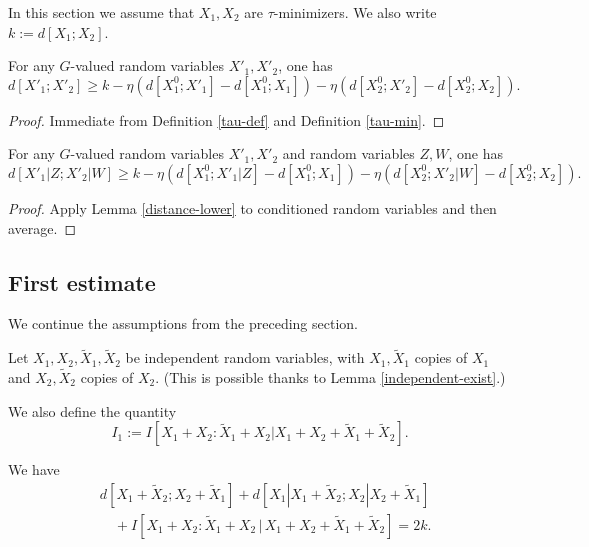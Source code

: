 In this section we assume that $X_1,X_2$ are $\tau$-minimizers. We also write $k := d[X_1;X_2]$.

\begin{lemma}\label{distance-lower}
  \leanok
  For any $G$-valued random variables $X'_1,X'_2$, one has
$$ d[X'_1;X'_2] \geq k - \eta (d[X^0_1;X'_1] - d[X^0_1;X_1] ) - \eta (d[X^0_2;X'_2] - d[X^0_2;X_2] ).$$
\end{lemma}

\begin{proof}
  \leanok
  Immediate from Definition \ref{tau-def} and Definition \ref{tau-min}.
\end{proof}

\begin{lemma}\label{cond-distance-lower}
  \leanok
  For any $G$-valued random variables $X'_1,X'_2$ and random variables $Z,W$, one has
$$ d[X'_1|Z;X'_2|W] \geq k - \eta (d[X^0_1;X'_1|Z] - d[X^0_1;X_1] ) - \eta (d[X^0_2;X'_2|W] - d[X^0_2;X_2] ).$$
\end{lemma}

\begin{proof}  Apply Lemma \ref{distance-lower} to conditioned random variables and then average.
\end{proof}

\subsection{First estimate}

We continue the assumptions from the preceding section.

Let $X_1, X_2, \tilde X_1, \tilde X_2$ be independent random variables, with $X_1,\tilde X_1$ copies of $X_1$ and $X_2,\tilde X_2$ copies of $X_2$.  (This is possible thanks to Lemma \ref{independent-exist}.)

We also define the quantity
$$ I_1 :=  I [ X_1+X_2 : \tilde X_1 + X_2 | X_1+X_2+\tilde X_1+\tilde X_2 ].$$

\begin{lemma}\label{first-fibre}
  \leanok
  We have
  \begin{align*}
    &   d[X_1+\tilde X_2;X_2+\tilde X_1] + d[X_1|X_1+\tilde X_2; X_2|X_2+\tilde X_1] \\
    &\quad + I[ X_1+ X_2 : \tilde X_1 + X_2 \,|\, X_1 + X_2 + \tilde X_1 + \tilde X_2 ] = 2k.
  \end{align*}
\end{lemma}

